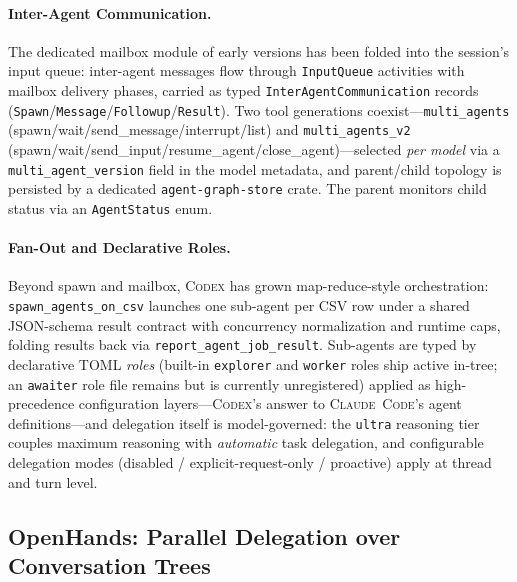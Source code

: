 \documentclass[11pt,a4paper]{article}
\newcommand{\clcode}{\textsc{Claude~Code}\xspace}
\newcommand{\cdx}{\textsc{Codex}\xspace}
\begin{document}
\paragraph{Inter-Agent Communication.}
The dedicated mailbox module of early versions has been folded into the session's input queue: inter-agent messages flow through \texttt{InputQueue} activities with mailbox delivery phases, carried as typed \texttt{InterAgentCommunication} records (\texttt{Spawn}/\texttt{Message}/\texttt{Followup}/\texttt{Result}).
Two tool generations coexist---\texttt{multi\_agents} (spawn/wait/send\_message/interrupt/list) and \texttt{multi\_agents\_v2} (spawn/wait/send\_input/resume\_agent/close\_agent)---selected \emph{per model} via a \texttt{multi\_agent\_version} field in the model metadata, and parent/child topology is persisted by a dedicated \texttt{agent-graph-store} crate.
The parent monitors child status via an \texttt{AgentStatus} enum.

\paragraph{Fan-Out and Declarative Roles.}
Beyond spawn and mailbox, \cdx{} has grown map-reduce-style orchestration: \texttt{spawn\_agents\_on\_csv} launches one sub-agent per CSV row under a shared JSON-schema result contract with concurrency normalization and runtime caps, folding results back via \texttt{report\_agent\_job\_result}.
Sub-agents are typed by declarative TOML \emph{roles} (built-in \texttt{explorer} and \texttt{worker} roles ship active in-tree; an \texttt{awaiter} role file remains but is currently unregistered) applied as high-precedence configuration layers---\cdx{}'s answer to \clcode{}'s agent definitions---and delegation itself is model-governed: the \texttt{ultra} reasoning tier couples maximum reasoning with \emph{automatic} task delegation, and configurable delegation modes (disabled / explicit-request-only / proactive) apply at thread and turn level.

\subsection{OpenHands: Parallel Delegation over Conversation Trees}
\end{document}
